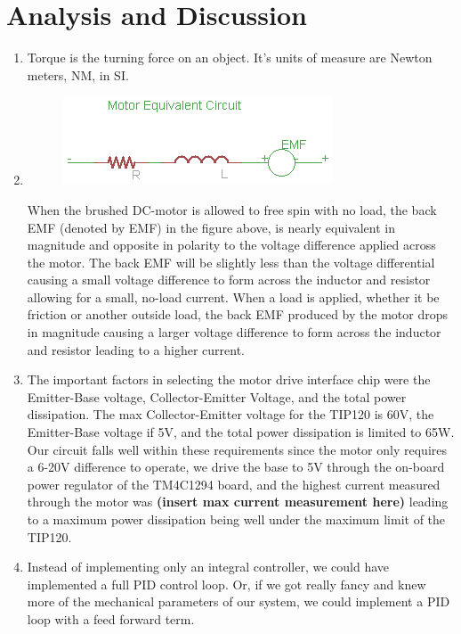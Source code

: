 \documentclass{article}
\begin{document}
\section{Analysis and Discussion}
	\begin{enumerate}
		\item %
			Torque is the turning force on an object. It's units of measure are Newton meters, NM, in SI.
		\item %
			\begin{figure}[h]
				\includegraphics[keepaspectratio, width=\textwidth]{Lab4Graphics/motorCircuit.png}
			\end{figure}
			When the brushed DC-motor is allowed to free spin with no load, the back EMF (denoted by EMF) in the figure above, is nearly equivalent in magnitude and opposite in polarity to the voltage difference applied across the motor. The back EMF will be slightly less than the voltage differential causing a small voltage difference to form across the inductor and resistor allowing for a small, no-load current. When a load is applied, whether it be friction or another outside load, the back EMF produced by the motor drops in magnitude causing a larger voltage difference to form across the inductor and resistor leading to a higher current.
		\item %
			The important factors in selecting the motor drive interface chip were the Emitter-Base voltage, Collector-Emitter Voltage, and the total power dissipation. The max Collector-Emitter voltage for the TIP120 is 60V, the Emitter-Base voltage if 5V, and the total power dissipation is limited to 65W. Our circuit falls well within these requirements since the motor only requires a 6-20V difference to operate, we drive the base to 5V through the on-board power regulator of the TM4C1294 board, and the highest current measured through the motor was \textbf{(insert max current measurement here)} leading to a maximum power dissipation being well under the maximum limit of the TIP120.
		\item %
			Instead of implementing only an integral controller, we could have implemented a full PID control loop. Or, if we got really fancy and knew more of the mechanical parameters of our system, we could implement a PID loop with a feed forward term.\\

\end{enumerate}
\end{document}
